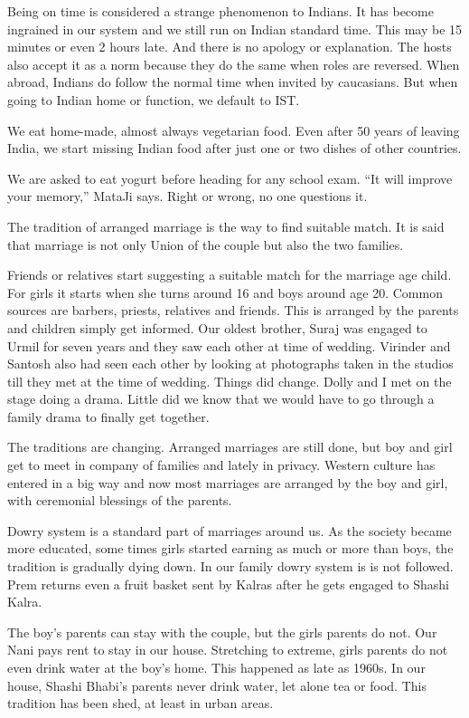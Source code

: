 Being on time is considered a strange phenomenon to Indians. It has become
ingrained in our system and we still run on Indian standard time. This may
be 15 minutes or even 2 hours late. And there is no apology or
explanation. The hosts also accept it as a norm because they do the same
when roles are reversed. When abroad, Indians do follow the normal time
when invited by caucasians. But when going to Indian home or function, we
default to IST. 

We eat home-made, almost always vegetarian food. Even after 50 years of
leaving India, we start missing Indian food after just one or two dishes
of other countries. 

We are asked to eat yogurt before heading for any school exam. “It will
improve your memory,” MataJi says. Right or wrong, no one questions it. 

The tradition of arranged marriage is the way to find suitable match. It
is said that marriage is not only Union of the couple but also the two
families. 

Friends or relatives start suggesting a suitable match for the marriage
age child. For girls it starts when she turns around 16 and boys around
age 20. Common sources are barbers, priests, relatives and friends. This
is arranged by the parents and children simply get informed. Our oldest
brother, Suraj was engaged to Urmil for seven years and they saw each
other at time of wedding. Virinder and Santosh also had seen each other by
looking at photographs taken in the studios till they met at the time of
wedding. Things did change. Dolly and I met on the stage doing a drama.
Little did we know that we would have to go through a family drama to
finally get together. 

The traditions are changing. Arranged marriages are still done, but boy
and girl get to meet in company of families and lately in privacy. Western
culture has entered in a big way and now most marriages are arranged by
the boy and girl, with ceremonial blessings of the parents. 

Dowry system is a standard part of marriages around us. As the society
became more educated, some times girls started earning as much or more
than boys, the tradition is gradually dying down. In our family dowry
system is is not followed. Prem returns even a fruit basket sent by Kalras
after he gets engaged to Shashi Kalra. 

The boy’s parents can stay with the couple, but the girls parents do not.
Our Nani pays rent to stay in our house. Stretching to extreme, girls
parents do not even drink water at the boy’s home. This happened as late
as 1960s. In our house, Shashi Bhabi’s parents never drink water, let
alone tea or food. This tradition has been shed, at least in urban areas. 

